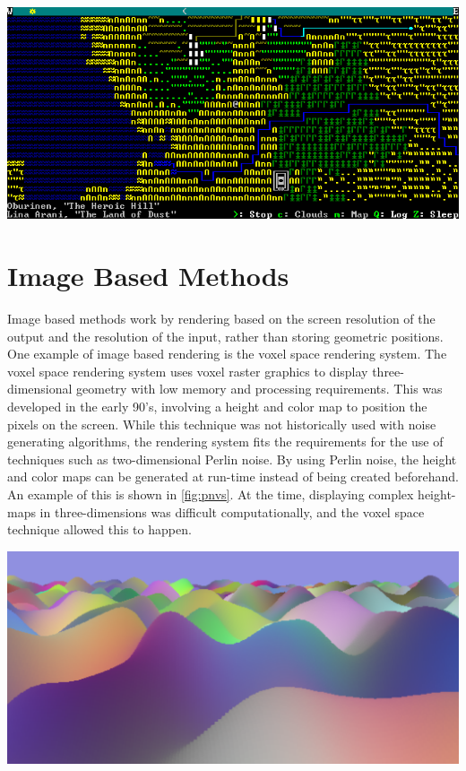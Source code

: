 \documentclass[10pt]{report}
\begin{document}
		\begin{minipage}{\textwidth}
			\centering
			\includegraphics[scale=.5]{dwarf_fortress}
			\label{fig:asciidf}
		\end{minipage}
	
		\section{Image Based Methods} \label{sec:imagebasedmethods}
		
		Image based methods work by rendering based on the screen resolution of the output and the resolution of the input, rather than storing geometric positions. One example of image based rendering is the voxel space rendering system. The voxel space rendering system uses voxel raster graphics to display three-dimensional geometry with low memory and processing requirements. This was developed in the early 90's, involving a height and color map to position the pixels on the screen. While this technique was not historically used with noise generating algorithms, the rendering system fits the requirements for the use of techniques such as two-dimensional Perlin noise. By using Perlin noise, the height and color maps can be generated at run-time instead of being created beforehand. An example of this is shown in \autoref{fig:pnvs}. At the time, displaying complex height-maps in three-dimensions was difficult computationally, and the voxel space technique allowed this to happen.
		
		\begin{minipage}{\textwidth}
			\centering
			\includegraphics[scale=.15]{proc-voxel}
			\label{fig:pnvs}
		\end{minipage}
		
\end{document}
